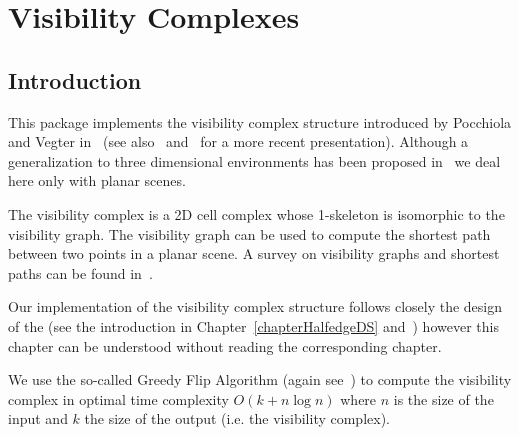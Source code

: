 
\ccParDims

\chapter{Visibility Complexes}
\label{chapterVisibilityComplex}

\minitoc

\section{Introduction}
\label{sectionVComplexIntroduction}
This package implements the visibility complex structure introduced by Pocchiola
and Vegter in~\cite{pv-vc-96} (see also~\cite{pv-tsvcpt-96}
and~\cite{G-ap-sstvc-01} for a more recent presentation). Although a
generalization to three dimensional environments has been proposed
in~\cite{ddp-fahrgv-99} we deal here only with planar scenes. 

The visibility complex is a 2D cell complex whose 1-skeleton is isomorphic to
the visibility graph.  The visibility graph can be used to compute the shortest
path between two points in a planar scene. A survey on visibility graphs and
shortest paths can be found in~\cite{m-gspno-00}.

Our implementation of the visibility complex structure follows closely the
design of the  (see the introduction in
Chapter~\ref{chapterHalfedgeDS} and~\cite{k-ugpdd-99}) however this chapter can
be understood without reading the corresponding chapter.

We use the so-called Greedy Flip Algorithm (again see~\cite{pv-tsvcpt-96}) to
compute the visibility complex in optimal time complexity $O(k + n\log n)$ where
$n$ is the size of the input and $k$ the size of the output (i.e. the visibility
complex).
